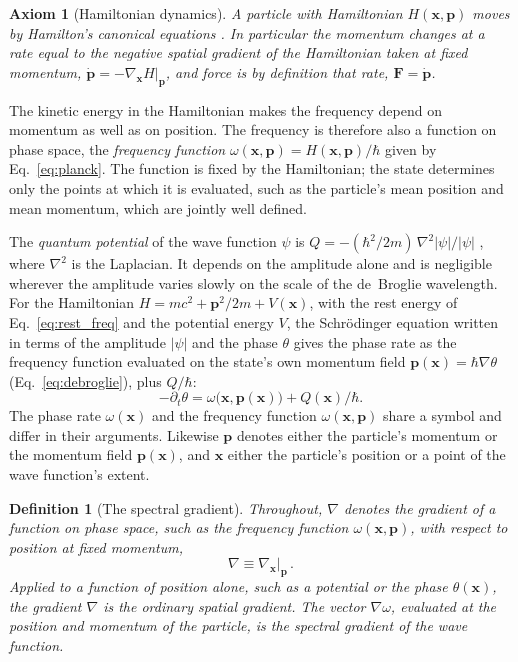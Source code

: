 \documentclass[aps,prd,onecolumn,tightenlines,nofootinbib,notitlepage,11pt,floatfix]{revtex4-2}
\theoremstyle{indentedtheorem}
\newtheorem{definition}{Definition}
\newtheorem{axiom}{Axiom}
\begin{document}
\begin{axiom}[Hamiltonian dynamics]\label{ax:hamilton}
A particle with Hamiltonian $H(\mathbf{x},\mathbf{p})$ moves by Hamilton's canonical equations \citep{Hamilton1835Second,Goldstein2002Classical}. In particular the momentum changes at a rate equal to the negative spatial gradient of the Hamiltonian taken at fixed momentum, $\dot{\mathbf{p}}=-\nabla_{\mathbf{x}}H|_{\mathbf{p}}$, and force is by definition that rate, $\mathbf{F}=\dot{\mathbf{p}}$.
\end{axiom}

\noindent The kinetic energy in the Hamiltonian makes the frequency depend on momentum as well as on position. The frequency is therefore also a function on phase space, the \emph{frequency function} $\omega(\mathbf{x},\mathbf{p})=H(\mathbf{x},\mathbf{p})/\hbar$ given by Eq.~\eqref{eq:planck}. The function is fixed by the Hamiltonian; the state determines only the points at which it is evaluated, such as the particle's mean position and mean momentum, which are jointly well defined.

The \emph{quantum potential} of the wave function $\psi$ is $Q=-(\hbar^2/2m)\,\nabla^2|\psi|/|\psi|$ \citep{Madelung1927Quantentheorie,Bohm1952Suggested}, where $\nabla^2$ is the Laplacian. It depends on the amplitude alone and is negligible wherever the amplitude varies slowly on the scale of the de~Broglie wavelength. For the Hamiltonian $H=mc^2+\mathbf{p}^2/2m+V(\mathbf{x})$, with the rest energy of Eq.~\eqref{eq:rest_freq} and the potential energy $V$, the Schr\"odinger equation \citep{Schrodinger1926Quantization4} written in terms of the amplitude $|\psi|$ and the phase $\theta$ gives the phase rate as the frequency function evaluated on the state's own momentum field $\mathbf{p}(\mathbf{x})=\hbar\nabla\theta$ (Eq.~\eqref{eq:debroglie}), plus $Q/\hbar$:
\begin{equation}
    -\partial_t\theta = \omega\big(\mathbf{x},\mathbf{p}(\mathbf{x})\big) + Q(\mathbf{x})/\hbar .
    \label{eq:phase_rate_split}
\end{equation}
The phase rate $\omega(\mathbf{x})$ and the frequency function $\omega(\mathbf{x},\mathbf{p})$ share a symbol and differ in their arguments. Likewise $\mathbf{p}$ denotes either the particle's momentum or the momentum field $\mathbf{p}(\mathbf{x})$, and $\mathbf{x}$ either the particle's position or a point of the wave function's extent.

\begin{definition}[The spectral gradient]\label{def:spectral_gradient}
Throughout, $\nabla$ denotes the gradient of a function on phase space, such as the frequency function $\omega(\mathbf{x},\mathbf{p})$, with respect to position at fixed momentum,
\begin{equation}
    \nabla \equiv \nabla_{\mathbf{x}}\big|_{\mathbf{p}} \, .
    \label{eq:gradient_def}
\end{equation}
Applied to a function of position alone, such as a potential or the phase $\theta(\mathbf{x})$, the gradient $\nabla$ is the ordinary spatial gradient. The vector $\nabla\omega$, evaluated at the position and momentum of the particle, is the \emph{spectral gradient} of the wave function.
\end{definition}
\end{document}
